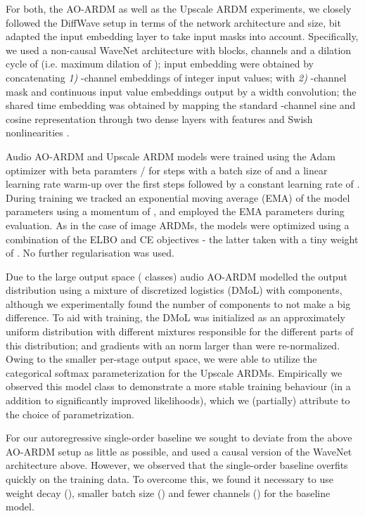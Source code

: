 \documentclass{article} \usepackage{iclr2022_conference,times}
\begin{document}
For both, the AO-ARDM as well as the Upscale ARDM experiments, we closely followed the DiffWave setup \citep{kong2021diffwave} in terms of the network architecture and size, bit adapted the input embedding layer to take input masks into account. Specifically, we used a non-causal WaveNet \citep{oord2016wavenet} architecture with  blocks,  channels and a dilation cycle of  (i.e. maximum dilation of ); input embedding were obtained by concatenating \textit{1)} -channel embeddings of integer input values; with \textit{2)} -channel mask and continuous input value embeddings output by a width  convolution; the shared time embedding was obtained by mapping the standard -channel sine and cosine representation through two dense layers with  features and Swish nonlinearities \citep{elfwing2018sigmoid}.

Audio AO-ARDM and Upscale ARDM models were trained using the Adam optimizer \citep{kingma2014adam} with beta paramters  /  for  steps with a batch size of  and a linear learning rate warm-up over the first  steps followed by a constant learning rate of . During training we tracked an exponential moving average (EMA) of the model parameters using a momentum of , and employed the EMA parameters during evaluation. As in the case of image ARDMs, the models were optimized using a combination of the ELBO and CE objectives - the latter taken with a tiny weight of . No further regularisation was used.

Due to the large output space ( classes) audio AO-ARDM modelled the output distribution using a mixture of discretized logistics (DMoL) with  components, although we experimentally found the number of components to not make a big difference. To aid with training, the DMoL was initialized as an approximately uniform distribution with different mixtures responsible for the different parts of this distribution; and gradients with an  norm larger than  were re-normalized. Owing to the smaller per-stage output space, we were able to utilize the categorical softmax parameterization for the Upscale ARDMs. Empirically we observed this model class to demonstrate a more stable training behaviour (in a addition to significantly improved likelihoods), which we (partially) attribute to the choice of parametrization.

For our autoregressive single-order baseline we sought to deviate from the above AO-ARDM setup as little as possible, and used a causal version of the WaveNet architecture above. However, we observed that the single-order baseline overfits quickly on the training data. To overcome this, we found it necessary to use weight decay (), smaller batch size () and fewer channels () for the baseline model.
 
\end{document}
